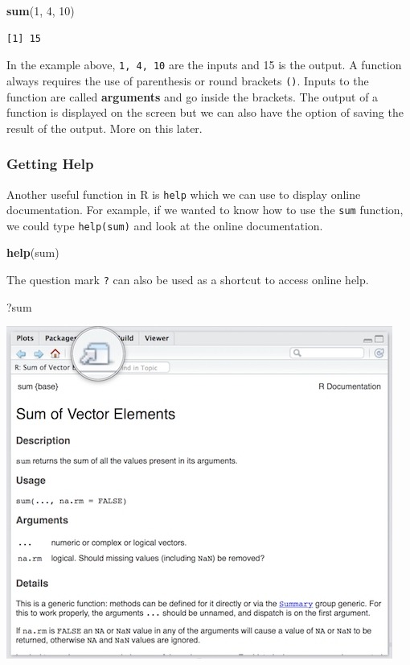 \documentclass[]{article}
\newenvironment{Shaded}{\begin{snugshade}}{\end{snugshade}}
\newcommand{\DecValTok}[1]{\textcolor[rgb]{0.00,0.00,0.81}{#1}}
\newcommand{\KeywordTok}[1]{\textcolor[rgb]{0.13,0.29,0.53}{\textbf{#1}}}
\newcommand{\NormalTok}[1]{#1}
\begin{document}
\begin{Shaded}
\begin{Highlighting}[]
\KeywordTok{sum}\NormalTok{(}\DecValTok{1}\NormalTok{, }\DecValTok{4}\NormalTok{, }\DecValTok{10}\NormalTok{)}
\end{Highlighting}
\end{Shaded}

\begin{verbatim}
[1] 15
\end{verbatim}

In the example above, \texttt{1,\ 4,\ 10} are the inputs and 15 is the output. A function always requires the use of parenthesis or round brackets \texttt{()}. Inputs to the function are called \textbf{arguments} and go inside the brackets. The output of a function is displayed on the screen but we can also have the option of saving the result of the output. More on this later.

\hypertarget{getting-help}{%
\subsubsection{Getting Help}\label{getting-help}}

Another useful function in R is \texttt{help} which we can use to display online documentation. For example, if we wanted to know how to use the \texttt{sum} function, we could type \texttt{help(sum)} and look at the online documentation.

\begin{Shaded}
\begin{Highlighting}[]
\KeywordTok{help}\NormalTok{(sum)}
\end{Highlighting}
\end{Shaded}

The question mark \texttt{?} can also be used as a shortcut to access online help.

\begin{Shaded}
\begin{Highlighting}[]
\NormalTok{?sum}
\end{Highlighting}
\end{Shaded}

\includegraphics{./img/rstudio_help.png}
\end{document}
